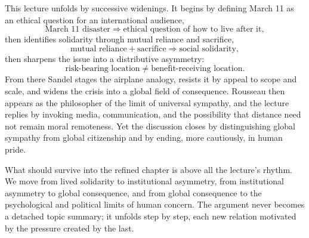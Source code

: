 This lecture unfolds by successive widenings. It begins by defining March 11 as an ethical question for an international audience,
\begin{equation}
\text{March 11 disaster}
\Longrightarrow
\text{ethical question of how to live after it},
\end{equation}
then identifies solidarity through mutual reliance and sacrifice,
\begin{equation}
\text{mutual reliance} + \text{sacrifice}
\Longrightarrow
\text{social solidarity},
\end{equation}
then sharpens the issue into a distributive asymmetry:
\begin{equation}
\text{risk-bearing location}
\neq
\text{benefit-receiving location}.
\end{equation}
From there Sandel stages the airplane analogy, resists it by appeal to scope and scale, and widens the crisis into a global field of consequence. Rousseau then appears as the philosopher of the limit of universal sympathy, and the lecture replies by invoking media, communication, and the possibility that distance need not remain moral remoteness. Yet the discussion closes by distinguishing global sympathy from global citizenship and by ending, more cautiously, in human pride.

What should survive into the refined chapter is above all the lecture's rhythm. We move from lived solidarity to institutional asymmetry, from institutional asymmetry to global consequence, and from global consequence to the psychological and political limits of human concern. The argument never becomes a detached topic summary; it unfolds step by step, each new relation motivated by the pressure created by the last.